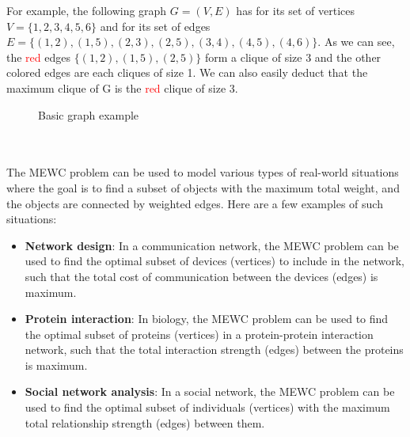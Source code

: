 \begin{minipage}{0.5\textwidth}
    For example, the following graph $G=(V,E)$ has for its set of vertices
    $V=\{1,2,3,4,5,6\}$ and for its set of edges
    $E=\{(1,2),(1,5),(2,3),(2,5),(3,4),(4,5),(4,6)\}$.
    As we can see, the \textcolor{red}{red} edges $\{(1,2),(1,5),(2,5)\}$ form a 
    clique of size 3 and the other colored edges are each cliques of size 1. 
    We can also easily deduct that the maximum clique of G is the 
    \textcolor{red}{red} clique of size 3.
\end{minipage}
\begin{minipage}{0.5\textwidth}
    \begin{figure}[H]
        \centering
        \caption{Basic graph example}
        \label{fig:basic-graph-example}
    \end{figure}
\end{minipage} \\ \\

The MEWC problem can be used to model various types of real-world situations where
the goal is to find a subset of objects with the maximum total weight, and the
objects are connected by weighted edges. Here are a few examples of such situations:

\begin{itemize}
    \item \textbf{Network design}: In a communication network, the MEWC problem
          can be used to find the optimal subset of devices (vertices) to include in
          the network, such that the total cost of communication between the devices
          (edges) is maximum.
    \item \textbf{Protein interaction}: In biology, the MEWC problem can be used
          to find the optimal subset of proteins (vertices) in a protein-protein
          interaction network, such that the total interaction strength (edges)
          between the proteins is maximum.
    \item \textbf{Social network analysis}: In a social network, the MEWC problem
          can be used to find the optimal subset of individuals (vertices) with
          the maximum total relationship strength (edges) between them.
\end{itemize}